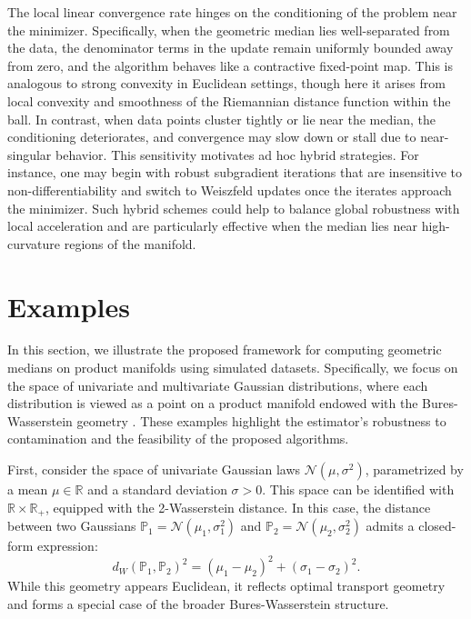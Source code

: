 \documentclass[10pt]{article}
\newcommand{\bbP}{\mathbb{P}}
\newcommand{\bbR}{\mathbb{R}}
\newcommand{\bbRpos}{\mathbb{R}_{+}}
\newcommand{\calN}{\mathcal{N}}
\begin{document}
The local linear convergence rate hinges on the conditioning of the problem near the minimizer. Specifically, when the geometric median lies well-separated from the data, the denominator terms in the update remain uniformly bounded away from zero, and the algorithm behaves like a contractive fixed-point map. This is analogous to strong convexity in Euclidean settings, though here it arises from local convexity and smoothness of the Riemannian distance function within the ball. In contrast, when data points cluster tightly or lie near the median, the conditioning deteriorates, and convergence may slow down or stall due to near-singular behavior. This sensitivity motivates ad hoc hybrid strategies. For instance, one may begin with robust subgradient iterations that are insensitive to non-differentiability and switch to Weiszfeld updates once the iterates approach the minimizer. Such hybrid schemes could help to balance global robustness with local acceleration and are particularly effective when the median lies near high-curvature regions of the manifold.



\section{Examples}\label{sec:examples}
In this section, we illustrate the proposed framework for computing geometric medians on product manifolds using simulated datasets. Specifically, we focus on the space of univariate and multivariate Gaussian distributions, where each distribution is viewed as a point on a product manifold endowed with the Bures-Wasserstein geometry  \citep{takatsu_2011_WassersteinGeometryGaussian}. These examples highlight the estimator’s robustness to contamination and the feasibility of the proposed algorithms.


First, consider the space of univariate Gaussian laws  $\calN(\mu,\sigma^2)$, parametrized by a mean $\mu \in \bbR$ and a standard deviation $\sigma > 0$. This space can be identified with $\bbR \times \bbRpos$, equipped with the 2-Wasserstein distance. In this case, the distance between two Gaussians $\bbP_1 = \calN(\mu_1,\sigma_1^2)$ and $\bbP_2 = \calN(\mu_2,\sigma_2^2)$ admits a closed-form expression:
\begin{equation}\label{def:bures_univariate}
d_W (\bbP_1, \bbP_2)^2 = (\mu_1 - \mu_2)^2 + (\sigma_1 - \sigma_2)^2.
\end{equation}
While this geometry appears Euclidean, it reflects optimal transport geometry and forms a special case of the broader Bures-Wasserstein structure.
\end{document}

